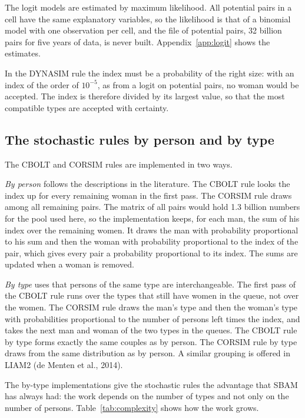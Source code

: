 \documentclass[12pt,a4paper]{article}
\begin{document}
The logit models are estimated by maximum likelihood. All potential pairs in a cell have the same
explanatory variables, so the likelihood is that of a binomial model with one observation per
cell, and the file of potential pairs, 32 billion pairs for five years of data, is never built.
Appendix~\ref{app:logit} shows the estimates.

In the DYNASIM rule the index must be a probability of the right size: with an index of the order
of $10^{-5}$, as from a logit on potential pairs, no woman would be accepted. The index is
therefore divided by its largest value, so that the most compatible types are accepted with
certainty.

\subsection{The stochastic rules by person and by type}

The CBOLT and CORSIM rules are implemented in two ways.

\emph{By person} follows the descriptions in the literature. The CBOLT rule looks the index up
for every remaining woman in the first pass. The CORSIM rule draws among all remaining pairs. The
matrix of all pairs would hold 1.3 billion numbers for the pool used here, so the implementation
keeps, for each man, the sum of his index over the remaining women. It draws the man with
probability proportional to his sum and then the woman with probability proportional to the index
of the pair, which gives every pair a probability proportional to its index. The sums are updated
when a woman is removed.

\emph{By type} uses that persons of the same type are interchangeable. The first pass of the
CBOLT rule runs over the types that still have women in the queue, not over the women. The
CORSIM rule draws the man's type and then the woman's type with probabilities proportional to the
number of persons left times the index, and takes the next man and woman of the two types in the
queues. The CBOLT rule by type forms exactly the same couples as by person. The CORSIM rule by
type draws from the same distribution as by person. A similar grouping is offered in LIAM2 (de
Menten et al., 2014).

The by-type implementations give the stochastic rules the advantage that SBAM has always had: the
work depends on the number of types and not only on the number of persons.
Table~\ref{tab:complexity} shows how the work grows.
\end{document}
